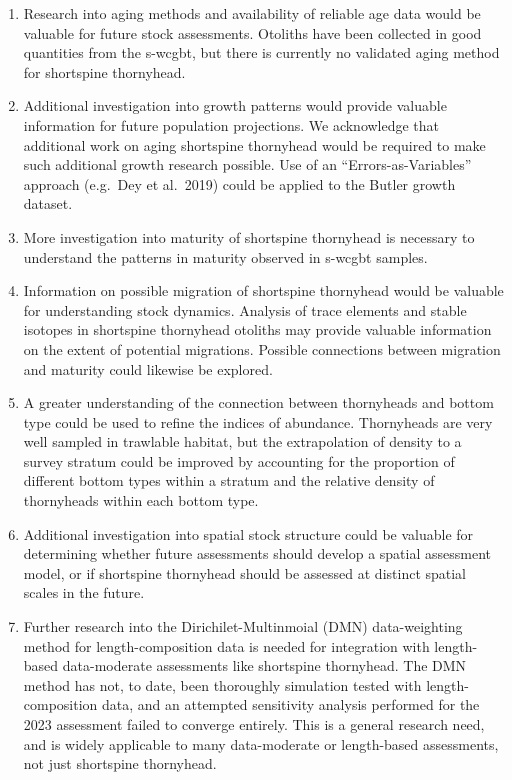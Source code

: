 \documentclass[11pt,
  letterpaper,
]{article}
\providecommand{\tightlist}{%
  \setlength{\itemsep}{0pt}\setlength{\parskip}{0pt}}
\providecommand{\tightlist}{%
  \setlength{\itemsep}{0pt}\setlength{\parskip}{0pt}}
\begin{document}
\begin{enumerate}
\def\labelenumi{\arabic{enumi}.}
\tightlist
\item
  Research into aging methods and availability of reliable age data would be valuable for future stock assessments. Otoliths have been collected in good quantities from the \gls{s-wcgbt}, but there is currently no validated aging method for shortspine thornyhead.
\item
  Additional investigation into growth patterns would provide valuable information for future population projections. We acknowledge that additional work on aging shortspine thornyhead would be required to make such additional growth research possible. Use of an ``Errors-as-Variables'' approach (e.g.~Dey et al.~2019) could be applied to the Butler growth dataset.
\item
  More investigation into maturity of shortspine thornyhead is necessary to understand the patterns in maturity observed in \gls{s-wcgbt} samples.
\item
  Information on possible migration of shortspine thornyhead would be valuable for understanding stock dynamics. Analysis of trace elements and stable isotopes in shortspine thornyhead otoliths may provide valuable information on the extent of potential migrations. Possible connections between migration and maturity could likewise be explored.
\item
  A greater understanding of the connection between thornyheads and bottom type could be used to refine the indices of abundance. Thornyheads are very well sampled in trawlable habitat, but the extrapolation of density to a survey stratum could be improved by accounting for the proportion of different bottom types within a stratum and the relative density of thornyheads within each bottom type.
\item
  Additional investigation into spatial stock structure could be valuable for determining whether future assessments should develop a spatial assessment model, or if shortspine thornyhead should be assessed at distinct spatial scales in the future.
\item
  Further research into the Dirichilet-Multinmoial (DMN) data-weighting method for length-composition data is needed for integration with length-based data-moderate assessments like shortspine thornyhead. The DMN method has not, to date, been thoroughly simulation tested with length-composition data, and an attempted sensitivity analysis performed for the 2023 assessment failed to converge entirely. This is a general research need, and is widely applicable to many data-moderate or length-based assessments, not just shortspine thornyhead.
\end{enumerate}
\end{document}
